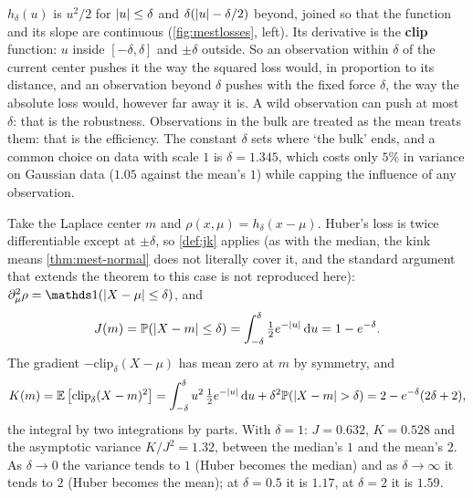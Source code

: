 \begin{intuition}
$h_\delta(u)$ is $u^2/2$ for $\lvert u\rvert \leq \delta$ and $\delta(\lvert u\rvert - \delta/2)$ beyond, joined so that the function and its slope are continuous (\cref{fig:mestlosses}, left).
Its derivative is the \textbf{clip} function: $u$ inside $[-\delta, \delta]$ and $\pm\delta$ outside.
So an observation within $\delta$ of the current center pushes it the way the squared loss would, in proportion to its distance, and an observation beyond $\delta$ pushes with the fixed force $\delta$, the way the absolute loss would, however far away it is.
A wild observation can push at most $\delta$: that is the robustness.
Observations in the bulk are treated as the mean treats them: that is the efficiency.
The constant $\delta$ sets where `the bulk' ends, and a common choice on data with scale $1$ is $\delta = 1.345$, which costs only $5\%$ in variance on Gaussian data ($1.05$ against the mean's $1$) while capping the influence of any observation.
\end{intuition}

\begin{worked}
Take the Laplace center $m$ and $\rho(x, \mu) = h_\delta(x - \mu)$.
Huber's loss is twice differentiable except at $\pm\delta$, so \cref{def:jk} applies (as with the median, the kink means \cref{thm:mest-normal} does not literally cover it, and the standard argument that extends the theorem to this case is not reproduced here): $\partial^2_\mu\rho = \ind(\abs{X - \mu} \leq \delta)$, and
\[
J(m) = \mathbb{P}(\lvert X - m\rvert \leq \delta) = \int_{-\delta}^\delta \tfrac12 e^{-\lvert u\rvert}\,\mathrm{d}u = 1 - e^{-\delta}.
\]
The gradient $-\mathrm{clip}_\delta(X - \mu)$ has mean zero at $m$ by symmetry, and
\[
K(m) = \operatorname*{\mathbb{E}}\big[\mathrm{clip}_\delta(X - m)^2\big] = \int_{-\delta}^\delta u^2\,\tfrac12 e^{-\lvert u\rvert}\,\mathrm{d}u + \delta^2\mathbb{P}(\lvert X - m\rvert > \delta) = 2 - e^{-\delta}(2\delta + 2),
\]
the integral by two integrations by parts.
With $\delta = 1$: $J = 0.632$, $K = 0.528$ and the asymptotic variance $K/J^2 = 1.32$, between the median's $1$ and the mean's $2$.
As $\delta \to 0$ the variance tends to $1$ (Huber becomes the median) and as $\delta \to \infty$ it tends to $2$ (Huber becomes the mean); at $\delta = 0.5$ it is $1.17$, at $\delta = 2$ it is $1.59$.
\end{worked}

